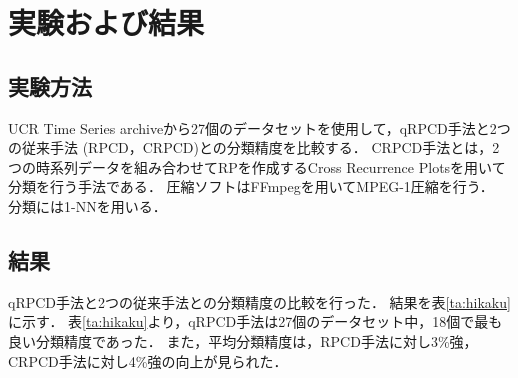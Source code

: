 \documentclass{interim} %
\begin{document}
\section{実験および結果}
\subsection{実験方法}
UCR Time Series archiveから27個のデータセットを使用して，qRPCD手法と2つの従来手法 (RPCD，CRPCD)との分類精度を比較する．
CRPCD手法とは，2つの時系列データを組み合わせてRPを作成するCross Recurrence Plotsを用いて分類を行う手法である\cite{CRP}．
圧縮ソフトはFFmpegを用いてMPEG-1圧縮を行う．
分類には1-NNを用いる．
\subsection{結果}
qRPCD手法と2つの従来手法との分類精度の比較を行った．
結果を表\ref{ta:hikaku}に示す．
表\ref{ta:hikaku}より，qRPCD手法は27個のデータセット中，18個で最も良い分類精度であった．
また，平均分類精度は，RPCD手法に対し3\%強，CRPCD手法に対し4\%強の向上が見られた．
\end{document}
